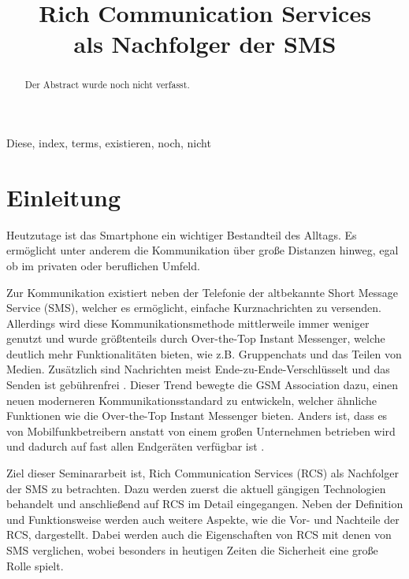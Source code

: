 \documentclass[conference]{IEEEtran}
\begin{document}
\title{Rich Communication Services\\als Nachfolger der SMS}

\author{
}

\maketitle

\begin{abstract}
    Der Abstract wurde noch nicht verfasst.
\end{abstract}

\begin{IEEEkeywords}
    Diese, index, terms, existieren, noch, nicht
\end{IEEEkeywords}

\section{Einleitung}
Heutzutage ist das Smartphone ein wichtiger Bestandteil des Alltags.
Es ermöglicht unter anderem die Kommunikation über große Distanzen hinweg, egal ob im privaten oder beruflichen Umfeld.

Zur Kommunikation existiert neben der Telefonie der altbekannte Short Message Service (SMS), welcher es ermöglicht, einfache Kurznachrichten zu versenden.
Allerdings wird diese Kommunikationsmethode mittlerweile immer weniger genutzt und wurde größtenteils durch Over-the-Top Instant Messenger, welche deutlich mehr Funktionalitäten bieten, wie z.B. Gruppenchats und das Teilen von Medien.
Zusätzlich sind Nachrichten meist Ende-zu-Ende-Verschlüsselt und das Senden ist gebührenfrei \cite{ottmobinter}.
Dieser Trend bewegte die GSM Association dazu, einen neuen moderneren Kommunikationsstandard zu entwickeln, welcher ähnliche Funktionen wie die Over-the-Top Instant Messenger bieten.
Anders ist, dass es von Mobilfunkbetreibern anstatt von einem großen Unternehmen betrieben wird und dadurch auf fast allen Endgeräten verfügbar ist \cite{uniprof,rcsmno}.

Ziel dieser Seminararbeit ist, Rich Communication Services (RCS) als Nachfolger der SMS zu betrachten.
Dazu werden zuerst die aktuell gängigen Technologien behandelt und anschließend auf RCS im Detail eingegangen.
Neben der Definition und Funktionsweise werden auch weitere Aspekte, wie die Vor- und Nachteile der RCS, dargestellt.
Dabei werden auch die Eigenschaften von RCS mit denen von SMS verglichen, wobei besonders in heutigen Zeiten die Sicherheit eine große Rolle spielt.
\end{document}
